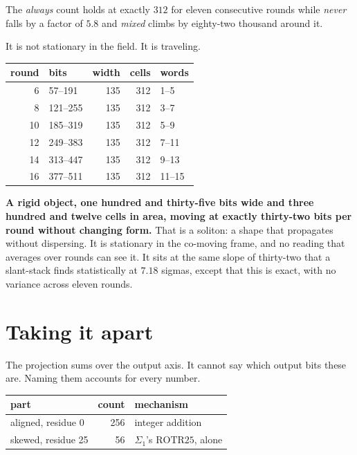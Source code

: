 The \emph{always} count holds at exactly \(312\) for eleven consecutive rounds while \emph{never}
falls by a factor of \(5.8\) and \emph{mixed} climbs by eighty-two thousand around it.

It is not stationary in the field. It is traveling.

\begin{center}
\begin{tabular}{rlrrl}
\toprule
round & bits & width & cells & words \\
\midrule
6 & 57--191 & 135 & 312 & 1--5 \\
8 & 121--255 & 135 & 312 & 3--7 \\
10 & 185--319 & 135 & 312 & 5--9 \\
12 & 249--383 & 135 & 312 & 7--11 \\
14 & 313--447 & 135 & 312 & 9--13 \\
16 & 377--511 & 135 & 312 & 11--15 \\
\bottomrule
\end{tabular}
\end{center}

\textbf{A rigid object, one hundred and thirty-five bits wide and three hundred and twelve cells in
area, moving at exactly thirty-two bits per round without changing form.} That is a soliton: a shape
that propagates without dispersing. It is stationary in the co-moving frame, and no reading that
averages over rounds can see it. It sits at the same slope of thirty-two that a slant-stack finds
statistically at \(7.18\) sigmas, except that this is exact, with no variance across eleven rounds.

\section{Taking it apart}

The projection sums over the output axis. It cannot say which output bits these are. Naming them
accounts for every number.

\begin{center}
\begin{tabular}{lrl}
\toprule
part & count & mechanism \\
\midrule
aligned, residue 0 & 256 & integer addition \\
skewed, residue 25 & 56 & \(\Sigma_1\)'s \(\mathrm{ROTR}25\), alone \\
\bottomrule
\end{tabular}
\end{center}

